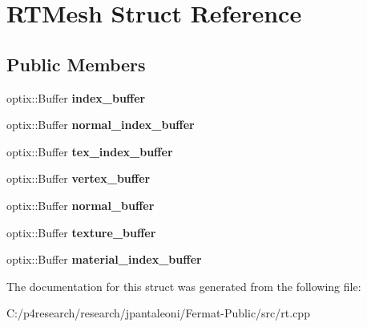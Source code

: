 \hypertarget{struct_r_t_mesh}{}\section{R\+T\+Mesh Struct Reference}
\label{struct_r_t_mesh}
\subsection*{Public Members}
\begin{DoxyCompactItemize}
\item 
\mbox{\label{struct_r_t_mesh_a0c4eb3836161eb7819ee584f64c09f50}} 
optix\+::\+Buffer {\bfseries index\+\_\+buffer}
\item 
\mbox{\label{struct_r_t_mesh_a509b8103b8e0e88e6e4b830d95155164}} 
optix\+::\+Buffer {\bfseries normal\+\_\+index\+\_\+buffer}
\item 
\mbox{\label{struct_r_t_mesh_a5f8cb7c7229f0f48d9ef0f92fd6c630e}} 
optix\+::\+Buffer {\bfseries tex\+\_\+index\+\_\+buffer}
\item 
\mbox{\label{struct_r_t_mesh_a67de422fbd78952ef7f3c3c0d186fb86}} 
optix\+::\+Buffer {\bfseries vertex\+\_\+buffer}
\item 
\mbox{\label{struct_r_t_mesh_a4d6d620da2e2a9c08a92a5f6333a0484}} 
optix\+::\+Buffer {\bfseries normal\+\_\+buffer}
\item 
\mbox{\label{struct_r_t_mesh_a56dea4d91e44fefbaa85ac750e1e0a96}} 
optix\+::\+Buffer {\bfseries texture\+\_\+buffer}
\item 
\mbox{\label{struct_r_t_mesh_ac60e483568606fd2d6d6ff45b9c72274}} 
optix\+::\+Buffer {\bfseries material\+\_\+index\+\_\+buffer}
\end{DoxyCompactItemize}


The documentation for this struct was generated from the following file\+:\begin{DoxyCompactItemize}
\item 
C\+:/p4research/research/jpantaleoni/\+Fermat-\/\+Public/src/rt.\+cpp\end{DoxyCompactItemize}
